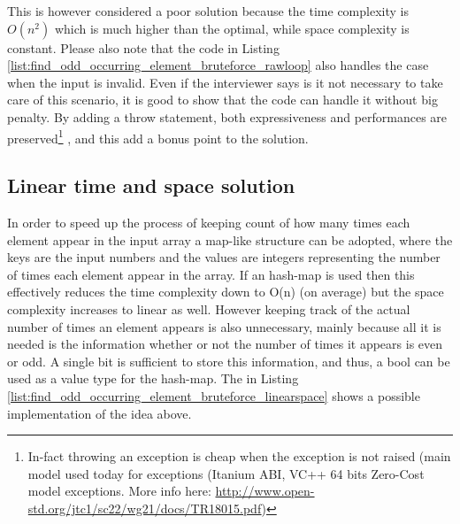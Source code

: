 


This is however considered a poor solution because the time complexity is $O(n^2)$ which is much higher than the optimal, while space complexity is constant. 
Please also note that the code in Listing \ref{list:find_odd_occurring_element_bruteforce_rawloop}  also handles the case when the input is invalid. Even if the interviewer says is it not necessary to take care of this scenario, it is good to show that the code can handle it without big penalty. By adding a throw statement, both expressiveness and  performances are preserved\footnote{ In-fact throwing an exception is cheap when the exception is not raised (main model used today for exceptions (Itanium ABI, VC++ 64 bits Zero-Cost model exceptions. More info here: \url{http://www.open-std.org/jtc1/sc22/wg21/docs/TR18015.pdf})} , and this add a bonus point to the solution. 

\subsection{Linear time and space solution}
\label{find_odd_occurring_element:sec:map}

In order to speed up the process of keeping count of how many times each element appear in the input array a map-like structure can be adopted, where the keys are the input numbers and the values are integers representing the number of times each element appear in the array. If an hash-map is used then this effectively reduces the time complexity down to O(n) (on average) but the space complexity increases to linear as well. However keeping track of the actual number of times an element appears is also unnecessary, mainly because all it is needed is the information whether or not the number of times it appears is even or odd. A single bit is sufficient to store this information, and thus, a bool can be used as a value type for the hash-map.
The in Listing \ref{list:find_odd_occurring_element_bruteforce_linearspace} shows a possible implementation of the idea above.




